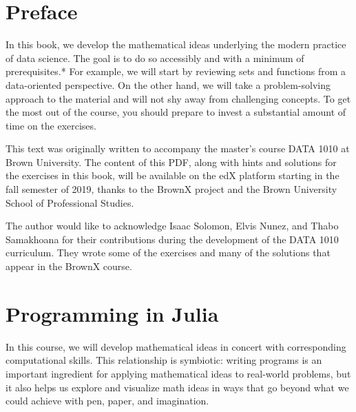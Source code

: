 \documentclass[prettycode,jlmin,shellescape]{watsonbook}
\begin{document}
 

\pagecolor{white} 

\newpage

\chapter*{Preface} \thispagestyle{empty}

In this book, we develop the mathematical ideas underlying the modern
practice of data science. The goal is to do so accessibly and with a
minimum of prerequisites.*  For example, we will start by
reviewing sets and functions from a data-oriented perspective. On the
other hand, we will take a problem-solving approach to the material
and will not shy away from challenging concepts. To get the most out
of the course, you should prepare to invest a substantial amount of
time on the exercises.

This text was originally written to accompany the master's course DATA
1010 at Brown University. The content of this PDF, along with hints
and solutions for the exercises in this book, will be available on the
edX platform starting in the fall semester of 2019, thanks to the
BrownX project and the Brown University School of Professional
Studies.

The author would like to acknowledge Isaac Solomon, Elvis Nunez, and
Thabo Samakhoana for their contributions during the development of the
DATA 1010 curriculum. They wrote some of the exercises and many of the
solutions that appear in the BrownX course.

\newpage

\tableofcontents

\newpage

\chapter{Programming in Julia} \label{ch:programming-in-julia} 

In this course, we will develop mathematical ideas in concert with corresponding computational skills. This relationship is symbiotic: writing programs is an important ingredient for applying mathematical ideas to real-world problems, but it also helps us explore and visualize math ideas in ways that go beyond what we could achieve with pen, paper, and imagination.
\end{document}
